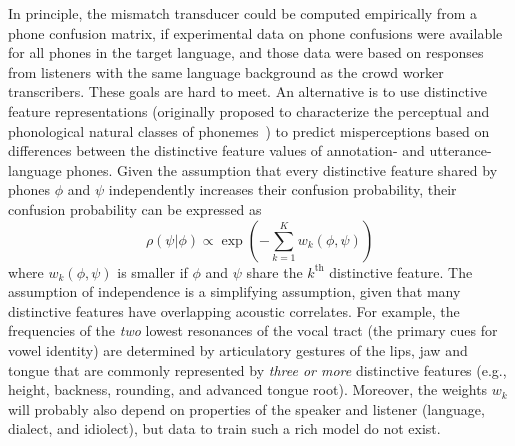 In principle, the mismatch transducer could be computed empirically from
a phone confusion matrix, if experimental data on phone confusions
were available for all phones in the target language, and those data
were based on responses from listeners with the same language background
as the crowd worker transcribers. These goals are hard to meet. 
An alternative is to use distinctive feature representations
(originally proposed to characterize the perceptual and phonological
natural classes of phonemes~\cite{Jakobson52}) to predict misperceptions
based on differences between the distinctive feature values of 
annotation- and utterance-language phones. Given the assumption that 
every distinctive feature shared by phones $\phi$ and $\psi$ 
independently increases their confusion probability, their confusion 
probability can be expressed as
\begin{equation}
  \rho(\psi|\phi)\propto \exp\left(-\sum_{k=1}^K
  w_k(\phi,\psi)\right)
  \label{eq:dfdist}
\end{equation}
where $w_k(\phi,\psi)$ is
smaller if $\phi$ and $\psi$ share the $k^{\textrm{th}}$ distinctive
feature. The assumption of independence is a simplifying assumption,
given that many distinctive features have overlapping acoustic
correlates. For example, the frequencies of the {\em two} lowest
resonances of the vocal tract (the primary cues for vowel identity) are
determined by articulatory gestures of the lips, jaw and tongue that are
commonly represented by {\em three or more} distinctive features
(e.g., height, backness, rounding, and advanced tongue root). Moreover,
the weights $w_k$ will probably also depend on properties of the speaker
and listener (language, dialect, and idiolect), but data to train such a
rich model do not exist.

